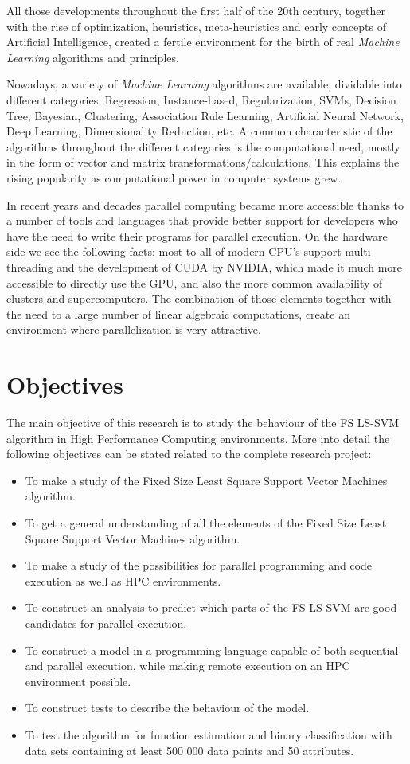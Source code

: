\par 
All those developments throughout the first half of the 20th century, together with the rise of optimization, heuristics, meta-heuristics and early concepts of Artificial Intelligence, created a fertile environment for the birth of real \textit{Machine Learning} algorithms and principles.
\par
Nowadays, a variety of \textit{Machine Learning} algorithms are available, dividable into different categories.
Regression, Instance-based, Regularization, SVMs, Decision Tree, Bayesian, Clustering, Association Rule Learning, Artificial Neural Network, Deep Learning, Dimensionality Reduction, etc.
A common characteristic of the algorithms throughout the different categories is the computational need, mostly in the form of vector and matrix transformations/calculations.
This explains the rising popularity as computational power in computer systems grew.
\par 
In recent years and decades parallel computing became more accessible thanks to a number of tools and languages that provide better support for developers who have the need to write their programs for parallel execution.
On the hardware side we see the following facts:  most to all of modern CPU's support multi threading and the development of CUDA by NVIDIA, which made it much more accessible to directly use the GPU, and also the more common availability of clusters and supercomputers.
The combination of those elements together with the need to a large number of linear algebraic computations,
create an environment where parallelization is very attractive.
\section{Objectives}
The main objective of this research is to study the behaviour of the FS LS-SVM algorithm in High Performance Computing environments. 
More into detail the following objectives can be stated related to the complete research project:
\begin{itemize}
	\item To make a study of the Fixed Size Least Square Support Vector Machines algorithm.
	\item To get a general understanding of all the elements of the Fixed Size Least Square Support Vector Machines algorithm.
	\item To make a study of the possibilities for parallel programming and code execution as well as HPC environments.
	\item To construct an analysis to predict which parts of the FS LS-SVM are good candidates for parallel execution.
	\item To construct a model in a programming language capable of both sequential and parallel execution, while making remote execution on an HPC environment possible.
	\item To construct tests to describe the behaviour of the model.
	\item To test the algorithm for function estimation and binary classification with data sets containing at least 500 000 data points and 50 attributes.
\end{itemize}
